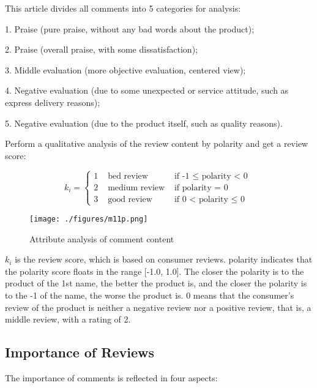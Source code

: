 \documentclass[UTF8]{article}
\begin{document}
This article divides all comments into 5 categories for analysis:

1. Praise (pure praise, without any bad words about the product);

2. Praise (overall praise, with some dissatisfaction);

3. Middle evaluation (more objective evaluation, centered view);

4. Negative evaluation (due to some unexpected or service attitude, such as express delivery reasons);

5. Negative evaluation (due to the product itself, such as quality reasons).

Perform a qualitative analysis of the review content by polarity and get a review score:

\begin{equation}\label{m1gs1}
k_i=\left\{\begin{array}{lll}
1 & \text { bed review } & \text {if -1 $\leq$ polarity < 0 }\\
2 & \text { medium review } & \text {if polarity = 0 }\\
3 & \text { good review } & \text {if 0 < polarity $\leq$ 0 }
\end{array}\right.
\end{equation}

\begin{figure}[!htbp]
	\centering
	\texttt{[image: ./figures/m11p.png]}
	\caption{Attribute analysis of comment content} \label{m11p}
\end{figure}

$k_i$ is the review score, which is based on consumer reviews. polarity indicates that the polarity score floats in the range [-1.0, 1.0]. The closer the polarity is to the product of the 1st name, the better the product is, and the closer the polarity is to the -1 of the name, the worse the product is. 0 means that the consumer's review of the product is neither a negative review nor a positive review, that is, a middle review, with a rating of 2.

\subsection{Importance of Reviews}

The importance of comments is reflected in four aspects:
\end{document}
